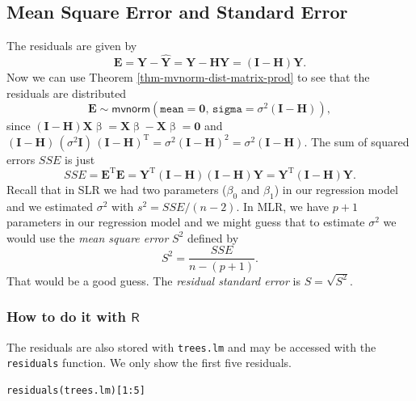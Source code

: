 \documentclass[captions=tableheading]{scrbook}
\begin{document}
\subsection{Mean Square Error and Standard Error}
\label{sec-12-2-3}
\label{sub-mlr-mse-se}


The residuals are given by
\begin{equation}
\mathbf{E}=\mathbf{Y}-\hat{\mathbf{Y}}=\mathbf{Y}-\mathbf{H}\mathbf{Y}=(\mathbf{I}-\mathbf{H})\mathbf{Y}.
\end{equation}
Now we can use Theorem \ref{thm-mvnorm-dist-matrix-prod} to see that the residuals are distributed
\begin{equation}
\mathbf{E}\sim\mathsf{mvnorm}(\mathtt{mean}=\mathbf{0},\,\mathtt{sigma}=\sigma^{2}(\mathbf{I}-\mathbf{H})),
\end{equation}
since \((\mathbf{I}-\mathbf{H})\mathbf{X}\upbeta=\mathbf{X}\upbeta-\mathbf{X}\upbeta=\mathbf{0}\) and \((\mathbf{I}-\mathbf{H})\,(\sigma^{2}\mathbf{I})\,(\mathbf{I}-\mathbf{H})^{\mathrm{T}}=\sigma^{2}(\mathbf{I}-\mathbf{H})^{2}=\sigma^{2}(\mathbf{I}-\mathbf{H})\). The sum of squared errors \(SSE\) is just
\begin{equation}
SSE=\mathbf{E}^{\mathrm{T}}\mathbf{E}=\mathbf{Y}^{\mathrm{T}}(\mathbf{I}-\mathbf{H})(\mathbf{I}-\mathbf{H})\mathbf{Y}=\mathbf{Y}^{\mathrm{T}}(\mathbf{I}-\mathbf{H})\mathbf{Y}.
\end{equation}
Recall that in SLR we had two parameters (\(\beta_{0}\) and \(\beta_{1}\)) in our regression model and we estimated \(\sigma^{2}\) with \(s^{2}=SSE/(n-2)\). In MLR, we have \(p+1\) parameters in our regression model and we might guess that to estimate \(\sigma^{2}\) we would use the \emph{mean square error} \(S^{2}\) defined by 
\begin{equation}
S^{2}=\frac{SSE}{n-(p+1)}.
\end{equation}
That would be a good guess. The \emph{residual standard error} is \(S=\sqrt{S^{2}}\).
\subsubsection{How to do it with \(\mathsf{R}\)}
\label{sec-12-2-3-1}


The residuals are also stored with \texttt{trees.lm} and may be accessed with the \texttt{residuals} function. We only show the first five residuals.


\lstset{language=R}
\begin{lstlisting}
residuals(trees.lm)[1:5]
\end{lstlisting}
\end{document}
